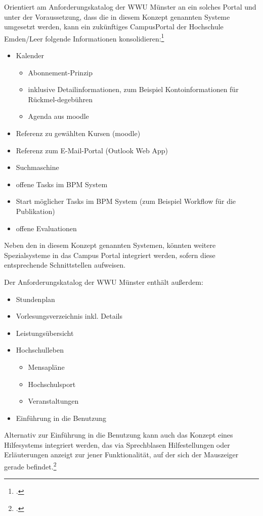 Orientiert am Anforderungskatalog der WWU Münster an ein solches Portal und unter der Voraussetzung, dass die in diesem Konzept genannten Systeme 
umgesetzt werden, kann ein zukünftiges CampusPortal der Hochschule Emden/Leer folgende Informationen konsolidieren:\footcite[Vgl.][158 ff.]{vogl_fortschritte_2012}

\begin{itemize}
	\item Kalender
	\begin{itemize}
		\item Abonnement-Prinzip
		\item inklusive Detailinformationen, zum Beispiel Kontoinformationen für Rückmel-degebühren
		\item Agenda aus moodle
	\end{itemize}
	\item Referenz zu gewählten Kursen (moodle)
	\item Referenz zum E-Mail-Portal (Outlook Web App)
	\item Suchmaschine
	\item offene Tasks im BPM System
	\item Start möglicher Tasks im BPM System (zum Beispiel Workflow für die Publikation)
	\item offene Evaluationen
\end{itemize}

Neben den in diesem Konzept genannten Systemen, könnten weitere Spezialsysteme in das Campus Portal integriert werden, sofern diese entsprechende Schnittstellen aufweisen. 

Der Anforderungskatalog der WWU Münster enthält außerdem:

\begin{itemize}
	\item Stundenplan
	\item Vorlesungsverzeichnis inkl. Details
	\item Leistungsübersicht
	\item Hochschulleben
	\begin{itemize}
		\item Mensapläne
		\item Hochschulsport
		\item Veranstaltungen
	\end{itemize}
	\item Einführung in die Benutzung
\end{itemize}

Alternativ zur Einführung in die Benutzung kann auch das Konzept eines Hilfesystems integriert werden, das via Sprechblasen Hilfestellungen oder Erläuterungen anzeigt zur jener Funktionalität, auf der sich der Mauszeiger gerade befindet.\footcite[Vgl.][22]{vogl_bericht_2013}

